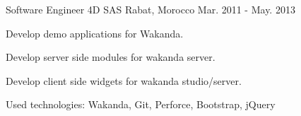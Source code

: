 \begin{cventries}
  \cventry
    {Software Engineer} %
    {4D SAS} %
    {Rabat, Morocco} %
    {Mar. 2011 - May. 2013} %
    {
      \begin{cvitems} %
        \item {Develop demo applications for Wakanda.}
        \item {Develop server side modules for wakanda server.}
        \item {Develop client side widgets for wakanda studio/server.}
        \item {Used technologies: Wakanda, Git, Perforce, Bootstrap, jQuery}
      \end{cvitems}
    }


\end{cventries}
